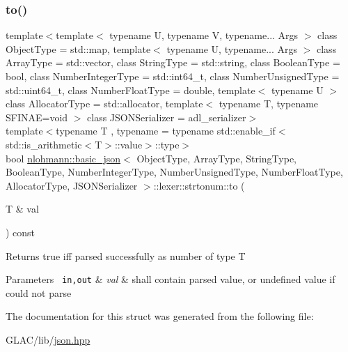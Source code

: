 \subsubsection{\texorpdfstring{to()}{to()}}
{\footnotesize\ttfamily template$<$template$<$ typename U, typename V, typename... Args $>$ class Object\+Type = std\+::map, template$<$ typename U, typename... Args $>$ class Array\+Type = std\+::vector, class String\+Type  = std\+::string, class Boolean\+Type  = bool, class Number\+Integer\+Type  = std\+::int64\+\_\+t, class Number\+Unsigned\+Type  = std\+::uint64\+\_\+t, class Number\+Float\+Type  = double, template$<$ typename U $>$ class Allocator\+Type = std\+::allocator, template$<$ typename T, typename S\+F\+I\+N\+A\+E=void $>$ class J\+S\+O\+N\+Serializer = adl\+\_\+serializer$>$ \\
template$<$typename T , typename  = typename std\+::enable\+\_\+if$<$std\+::is\+\_\+arithmetic$<$\+T$>$\+::value$>$\+::type$>$ \\
bool \mbox{\hyperlink{classnlohmann_1_1basic__json}{nlohmann\+::basic\+\_\+json}}$<$ Object\+Type, Array\+Type, String\+Type, Boolean\+Type, Number\+Integer\+Type, Number\+Unsigned\+Type, Number\+Float\+Type, Allocator\+Type, J\+S\+O\+N\+Serializer $>$\+::lexer\+::strtonum\+::to (\begin{DoxyParamCaption}\item[{T \&}]{val }\end{DoxyParamCaption}) const\hspace{0.3cm}{\ttfamily [inline]}}

\begin{DoxyReturn}{Returns}
true iff parsed successfully as number of type T
\end{DoxyReturn}

\begin{DoxyParams}[1]{Parameters}
\mbox{\texttt{ in,out}}  & {\em val} & shall contain parsed value, or undefined value if could not parse \\
\hline
\end{DoxyParams}


The documentation for this struct was generated from the following file\+:\begin{DoxyCompactItemize}
\item 
G\+L\+A\+C/lib/\mbox{\hyperlink{json_8hpp}{json.\+hpp}}\end{DoxyCompactItemize}
